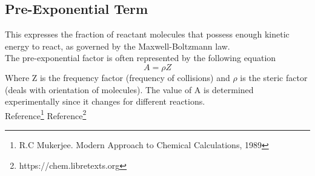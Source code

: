 \subsection*{Pre-Exponential Term}
This expresses the fraction of reactant molecules that possess enough kinetic energy to react, as governed by the Maxwell-Boltzmann law.\\
The pre-exponential factor is often represented by the following equation
\begin{equation}
A = \rho Z
\end{equation}
Where Z is the frequency factor (frequency of collisions) and $\rho$ is the steric factor (deals with orientation of molecules).
The value of A is determined experimentally since it changes for different reactions.\\

Reference\footnote{R.C Mukerjee. Modern Approach to Chemical Calculations, 1989}
Reference\footnote{https://chem.libretexts.org}
